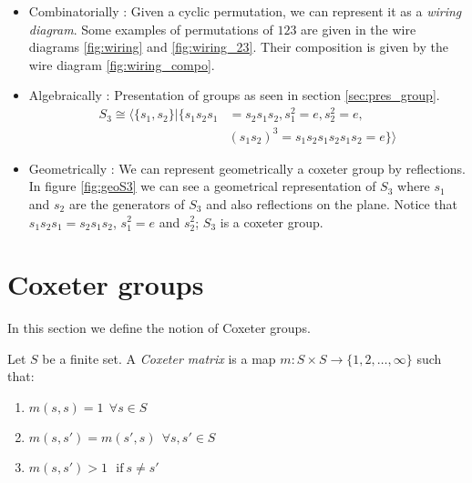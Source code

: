 \begin{itemize}
  \item Combinatorially : Given a cyclic permutation, we can represent it as a \emph{wiring diagram}. Some examples of permutations of $123$ are given in the wire diagrams \ref{fig:wiring} and \ref{fig:wiring_23}. Their composition is given by the wire diagram \ref{fig:wiring_compo}.




  \item Algebraically : Presentation of groups as seen in section \ref{sec:pres_group}.
  \begin{equation}\label{equation donnant la form explicite de pi}
  \begin{split}
  S_3 \cong \langle \{s_1, s_2\} | \{ s_1s_2s_1 &= s_2s_1s_2 , s_1^2 = e, s_2^2 = e,\\
   &(s_1s_2)^3 = s_1s_2s_1s_2s_1s_2 = e\} \rangle
  \end{split}
  \end{equation}

  \item Geometrically : We can represent geometrically a coxeter group by reflections. In figure \ref{fig:geoS3} we can see a geometrical representation of $S_3$ where $s_1$ and $s_2$ are the generators of $S_3$ and also reflections on the plane. Notice that $s_1s_2s_1 = s_2s_1s_2$, $s_1^2 = e$ and $s_2^2$; $S_3$ is a coxeter group.
\end{itemize}

\section{Coxeter groups}

In this section we define the notion of Coxeter groups.

\begin{definition} Let $S$ be a finite set.
  A \emph{Coxeter matrix} is a map $m : S\times S \to \{1,2,\dots,\infty\}$ such that:
  \begin{enumerate}
    \item $m(s,s) = 1 \ \ \forall s \in S$
    \item $m(s,s') = m(s', s) \ \ \forall s,s' \in S$
    \item $m(s,s') > 1\ \ \ \text{if}\  s \neq s'$
  \end{enumerate}
\end{definition}

